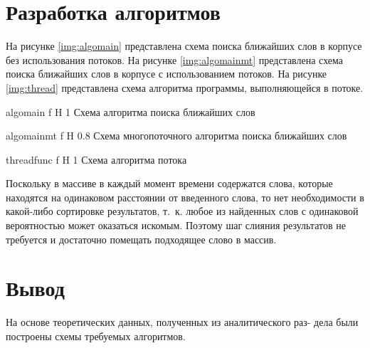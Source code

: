 \section{Разработка алгоритмов}

На рисунке \ref{img:algomain} представлена схема поиска ближайших слов в корпусе без использования потоков. 
На рисунке \ref{img:algomainmt} представлена схема поиска ближайших слов в корпусе с использованием потоков. 
На рисунке \ref{img:thread} представлена схема алгоритма программы, выполняющейся в потоке. 


{algomain} %
{f} %
{H} %
{1\textwidth} %
{Схема алгоритма поиска ближайших слов} %


{algomainmt} %
{f} %
{H} %
{0.8\textwidth} %
{Схема многопоточного алгоритма поиска ближайших слов} %


{threadfunc} %
{f} %
{H} %
{1\textwidth} %
{Схема алгоритма потока} %


Поскольку в массиве в каждый момент времени содержатся слова, которые находятся на одинаковом расстоянии от введенного слова, то нет необходимости в какой-либо сортировке результатов, т.~к. любое из найденных слов с одинаковой вероятностью может оказаться искомым. Поэтому шаг слияния результатов не требуется и достаточно помещать подходящее слово в массив.

\section*{Вывод}
На основе теоретических данных, полученных из аналитического раз-
дела были построены схемы требуемых алгоритмов. 